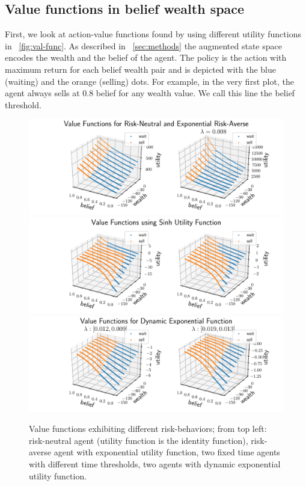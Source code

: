 \subsection{Value functions in belief wealth space}\label{ssec:val-func}

First, we look at action-value functions found by using different utility functions in ~\autoref{fig:val-func}.
As described in ~\autoref{sec:methods} the augmented state space encodes the wealth and the belief of the agent.
The policy is the action with maximum return for each belief wealth pair and is depicted with the blue (waiting) and the orange (selling) dots.
For example, in the very first plot, the agent always sells at 0.8 belief for any wealth value. We call this line the belief threshold.

\begin{figure}[h]
    \centering
    \includegraphics[width=0.99\linewidth]{img/exp_policy.pdf}\\
    \includegraphics[width=0.99\linewidth]{img/sinh_policy.pdf}\\
    \includegraphics[width=0.99\linewidth]{img/dyn_policy.pdf}
    \caption{Value functions exhibiting different risk-behaviors; from top left: risk-neutral agent (utility function is the identity function), risk-averse agent with exponential utility function, two fixed time agents with different time thresholds, two agents with dynamic exponential utility function.}\label{fig:val-func}
\end{figure}

